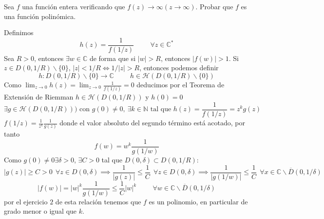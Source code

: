 \begin{ejer}
	Sea $f$ una función entera verificando que $f(z)\rightarrow\infty (z\rightarrow\infty)$. Probar que $f$ es una función polinómica.
\end{ejer}
\begin{sol}
	Definimos
	$$h(z) = \frac{1}{f(1/z)} \hspace{1cm} \forall z\in\mathbb{C}^{\ast}$$
	Sea $R>0$, entonces $\exists w\in\mathbb{C}$ de forma que si $|w|>R$, entonces $|f(w)|>1$.
	Si $z\in D(0,1/R)\backslash\{0\}$, $|z|<1/R \Longleftrightarrow 1/|z|>R$, entonces podemos definir
	$$h : D(0,1/R)\backslash\{0\} \rightarrow \mathbb{C} \hspace{1cm} h\in\mathcal{H}(D(0,1/R)\backslash\{0\})$$
	Como $\lim_{z\rightarrow 0} h(z) = \lim_{z\rightarrow 0} \frac{1}{f(1/z)} = 0$ deducimos por el Teorema de Extensión de Riemman
	$h\in\mathcal{H}(D(0,1/R))$ y $h(0)=0$
	$$\exists g\in\mathcal{H}(D(0,1/R))) \text{ con }g(0) \not = 0, \ \exists k\in\mathbb{N} \text{ tal que }h(z) = \frac{1}{f(1/z)} = z^k g(z)$$
	$ f(1/z) = \frac{1}{z^k}\frac{1}{g(z)}$
	donde el valor absoluto del segundo término está acotado, por tanto
	$$f(w) = w^k \frac{1}{g(1/w)}$$
	Como $g(0)\not = 0 \exists\delta>0$, $\exists C>0$ tal que $D(0,\delta)\subset D(0,1/R)$:
	$$|g(z)| \geq C > 0 \ \ \forall z\in D(0,\delta) \implies \frac{1}{|g(z)|} \leq \frac{1}{C} \ \ \forall z\in D(0,\delta) \implies \frac{1}{|g(1/w)|} \leq \frac{1}{C} \ \ \forall x\in \mathbb{C}\backslash \overline{D}(0,1/\delta)$$
	$$|f(w)| = |w|^k \frac{1}{g(1/w)} \leq \frac{1}{C}|w|^k \hspace{1cm} \forall w\in \mathbb{C}\backslash\overline{D}(0,1/\delta)$$
	por el ejercicio $2$ de esta relación tenemos que $f$ es un polinomio, en particular de grado menor o igual que $k$.
\end{sol}

